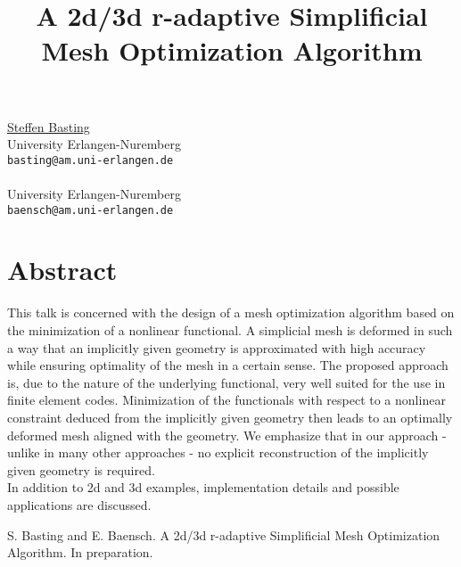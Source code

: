 \title{A 2d/3d r-adaptive Simplificial Mesh Optimization Algorithm}
 \author{} \institute{}
\maketitle
\begin{center}
{\large \underline{Steffen Basting}}\\
University Erlangen-Nuremberg\\
{\tt basting@am.uni-erlangen.de}
\\ \vspace{4mm}{\large Eberhard Baensch}\\
University Erlangen-Nuremberg\\
{\tt baensch@am.uni-erlangen.de}

\end{center}

\section*{Abstract}

This talk is concerned with the design of a mesh optimization algorithm based on the minimization of a nonlinear functional. A simplicial mesh is deformed in such a way that an implicitly given geometry is approximated with high accuracy while ensuring optimality of the mesh in a certain sense. The proposed approach is, due to the nature of the underlying functional, very well suited for the use in finite element codes. Minimization of the functionals with respect to a nonlinear constraint deduced from the implicitly given geometry then leads to an optimally deformed mesh aligned with the geometry. We emphasize that in our approach - unlike in many other approaches - no explicit reconstruction of the implicitly given geometry is required. \\

In addition to 2d and 3d examples, implementation details and possible applications are discussed. 

\nocite{ref_paper}


\begin{thebibliography}{10}

{\sc S. Basting and E. Baensch}. {A 2d/3d r-adaptive Simplificial Mesh Optimization Algorithm}. In preparation.

\end{thebibliography}
